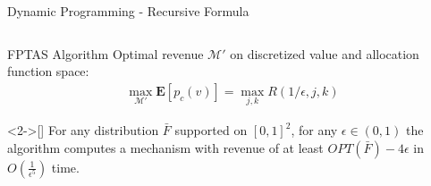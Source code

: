 \documentclass{beamer}
\begin{document}
\begin{frame}{Dynamic Programming - Recursive Formula}
\begin{columns}
\begin{column}{.3\textwidth}
\begin{center}
{
        }
      \end{center}
    \end{column}
  \end{columns}
\end{frame}

\begin{frame}{FPTAS Algorithm}
  Optimal revenue $\mathcal{M}'$ on discretized value and allocation function space:
  \begin{align*}
    \max_{\mathcal{M}'} \mathbf{E}\left[p_c(v)\right] = \max_{j,k} R(1/\epsilon, j, k)
  \end{align*}

  \begin{theorem}<2->[\citeauthor{primary}]
    For any distribution $\bar{F}$ supported on $[0,1]^2$, for any $\epsilon \in (0,1)$ the algorithm computes a mechanism with revenue of at least $OPT(\bar{F}) - 4\epsilon$ in $O(\frac{1}{\epsilon^5})$ time.
  \end{theorem}
\end{frame}
\end{document}
